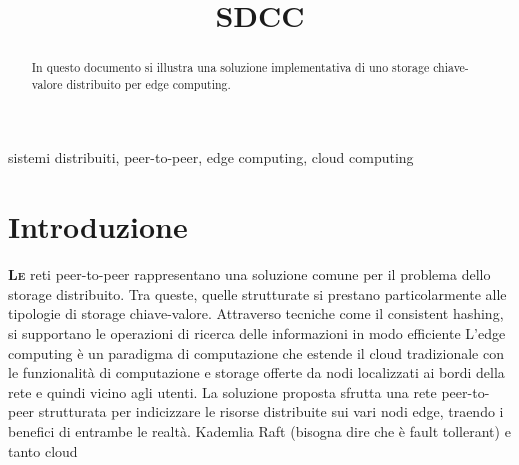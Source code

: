 \documentclass[conference]{IEEEtran}
\begin{document}
\title{SDCC}

\author{
}


\maketitle

\begin{abstract}
In questo documento si illustra una soluzione implementativa di uno storage chiave-valore distribuito per edge computing.
\end{abstract}

\begin{IEEEkeywords}
sistemi distribuiti, peer-to-peer, edge computing, cloud computing
\end{IEEEkeywords}

\section{Introduzione}
\lettrine{\textbf{L}}{\textbf{e}} reti peer-to-peer rappresentano una soluzione comune per il problema dello storage distribuito. Tra queste, quelle strutturate si prestano particolarmente alle tipologie di storage chiave-valore. Attraverso tecniche come il consistent hashing, si supportano le operazioni di ricerca delle informazioni in modo efficiente %
L'edge computing è un paradigma di computazione che estende il cloud tradizionale con le funzionalità di computazione e storage offerte da nodi localizzati ai bordi della rete e quindi vicino agli utenti. La soluzione proposta sfrutta una rete peer-to-peer strutturata per indicizzare le risorse distribuite sui vari nodi edge, traendo i benefici di entrambe le realtà. Kademlia Raft (bisogna dire che è fault tollerant) e tanto cloud
\end{document}
